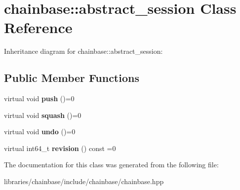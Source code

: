 \hypertarget{classchainbase_1_1abstract__session}{}\section{chainbase\+:\+:abstract\+\_\+session Class Reference}
\label{classchainbase_1_1abstract__session}


Inheritance diagram for chainbase\+:\+:abstract\+\_\+session\+:
\subsection*{Public Member Functions}
\begin{DoxyCompactItemize}
\item 
\mbox{\label{classchainbase_1_1abstract__session_ad5174211674f7494369f231172da9ec1}} 
virtual void {\bfseries push} ()=0
\item 
\mbox{\label{classchainbase_1_1abstract__session_afdb0f0d0dea60dc29f0c9905fbd1b68c}} 
virtual void {\bfseries squash} ()=0
\item 
\mbox{\label{classchainbase_1_1abstract__session_a0b61d83b436e01a7aca782633f50b1e1}} 
virtual void {\bfseries undo} ()=0
\item 
\mbox{\label{classchainbase_1_1abstract__session_a3652bb80d76148bc92335cd8e30c864b}} 
virtual int64\+\_\+t {\bfseries revision} () const =0
\end{DoxyCompactItemize}


The documentation for this class was generated from the following file\+:\begin{DoxyCompactItemize}
\item 
libraries/chainbase/include/chainbase/chainbase.\+hpp\end{DoxyCompactItemize}
